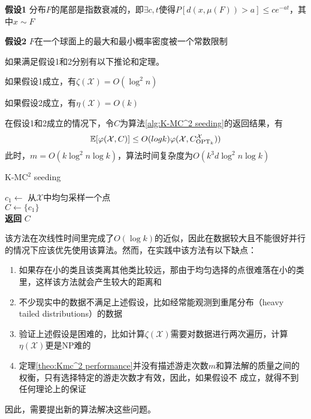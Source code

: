 \textbf{假设1} 分布$F$的尾部是指数衰减的，即$\exists c,t $使得$P[d(x,\mu(F))>a]\leq ce^{-at}$，其中$x\sim F$ 

\textbf{假设2} $F$在一个球面上的最大和最小概率密度被一个常数限制

如果满足假设1和2分别有以下推论和定理。
\begin{corollary}
    \label{cor: zeta_x}
    如果假设1成立，有$\zeta(\mathcal{X}) = O(\log^2 n)$
\end{corollary}
\begin{corollary}
    \label{cor: eta_x}
    如果假设2成立，有$\eta(\mathcal{X}) = O(k)$
\end{corollary}
\begin{theorem}
    \label{theo:Kmc^2 performance}
    在假设1和2成立的情况下，令$C$为算法\ref{alg:K-MC^2 seeding}的返回结果，有
    \begin{equation}
    \mathbb{E}[\varphi(\mathcal{X},C)]\leq O(logk)\varphi(\mathcal{X},C_{\text{OPT}_k}^{\mathcal{X}}))
    \end{equation}
    此时，$m = O(k\log^2 n\log k)$，算法时间复杂度为$O(k^3 d \log^2 n \log k)$
\end{theorem}
\begin{algorithm}[ht]
    \caption{K-M$\text{C}^2$ seeding}\label{alg:K-MC^2 seeding}
    $c_1 \gets $ 从$\mathcal{X}$中均匀采样一个点 \\
    $C \gets \{c_1\}$ \\
    \textbf{返回} $C$ %
\end{algorithm}
该方法在次线性时间里完成了$O(\log k)$的近似，因此在数据较大且不能很好并行的情况下应该优先使用该算法。然而，在实践中该方法有以下缺点：
\begin{enumerate}
    \item 如果存在小的类且该类离其他类比较远，那由于均匀选择的点很难落在小的类里，这样该方法就会产生较大的距离和
    \item 不少现实中的数据不满足上述假设，比如经常能观测到重尾分布（heavy tailed distributions）的数据
    \item 验证上述假设是困难的，比如计算$\zeta(\mathcal{X})$需要对数据进行两次遍历，计算$\eta(\mathcal{X})$更是NP难的
    \item 定理\ref{theo:Kmc^2 performance}并没有描述游走次数$m$和算法解的质量之间的权衡，只有选择特定的游走次数才有效，因此，如果假设不
成立，就得不到任何理论上的保证
\end{enumerate}
因此，需要提出新的算法解决这些问题。

